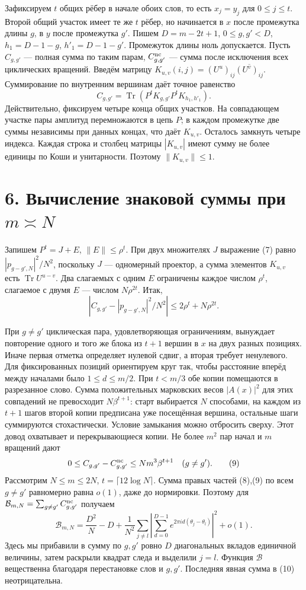 \documentclass[11pt,a4paper]{article}
\newcommand{\Tr}{\operatorname{Tr}}
\newcommand{\sect}[1]{\section*{\sffamily\color{ink}#1}}
\begin{document}
Зафиксируем $t$ общих рёбер в начале обоих слов, то есть $x_j=y_j$ для $0\le j\le t$. Второй общий участок имеет те же $t$ рёбер, но начинается в $x$ после промежутка длины $g$, в $y$ после промежутка $g'$. Пишем $D=m-2t+1$, $0\le g,g'<D$, $h_1=D-1-g$, $h'_1=D-1-g'$. Промежуток длины ноль допускается. Пусть $C_{g,g'}$ --- полная сумма по таким парам, $C^{\rm nc}_{g,g'}$ --- сумма после исключения всех циклических вращений. Введём матрицу $K_{u,v}(i,j)=(U^u)_{ij}\overline{(U^v)_{ij}}$. Суммирование по внутренним вершинам даёт точное равенство
\[
 C_{g,g'}=\Tr(P^t K_{g,g'} P^t K_{h_1,h'_1}).                          \tag{7}
\]
Действительно, фиксируем четыре конца общих участков. На совпадающем участке пары амплитуд перемножаются в цепь $P$; в каждом промежутке две суммы независимы при данных концах, что даёт $K_{u,v}$. Осталось замкнуть четыре индекса. Каждая строка и столбец матрицы $|K_{u,v}|$ имеют сумму не более единицы по Коши и унитарности. Поэтому $\|K_{u,v}\|\le1$.
\newpage
\sect{6. Вычисление знаковой суммы при $m\asymp N$}
Запишем $P^t=J+E$, $\|E\|\le\rho^t$. При двух множителях $J$ выражение (7) равно $|p_{g-g',N}|^2/N^2$, поскольку $J$ --- одномерный проектор, а сумма элементов $K_{u,v}$ есть $\Tr U^{u-v}$. Два слагаемых с одним $E$ ограничены каждое числом $\rho^t$, слагаемое с двумя $E$ --- числом $N\rho^{2t}$. Итак,
\[
 \left|C_{g,g'}-|p_{g-g',N}|^2/N^2\right|\le2\rho^t+N\rho^{2t}.         \tag{8}
\]

При $g\ne g'$ циклическая пара, удовлетворяющая ограничениям, вынуждает повторение одного и того же блока из $t+1$ вершин в $x$ на двух разных позициях. Иначе первая отметка определяет нулевой сдвиг, а вторая требует ненулевого. Для фиксированных позиций ориентируем круг так, чтобы расстояние вперёд между началами было $1\le d\le m/2$. При $t<m/3$ обе копии помещаются в разрезанное слово. Сумма положительных марковских весов $|A(x)|^2$ для этих совпадений не превосходит $N\beta^{t+1}$: старт выбирается $N$ способами, на каждом из $t+1$ шагов второй копии предписана уже посещённая вершина, остальные шаги суммируются стохастически. Условие замыкания можно отбросить сверху. Этот довод охватывает и перекрывающиеся копии. Не более $m^2$ пар начал и $m$ вращений дают
\[
 0\le C_{g,g'}-C^{\rm nc}_{g,g'}\le N m^3\beta^{t+1}\quad(g\ne g').      \tag{9}
\]
Рассмотрим $N\le m\le2N$, $t=\lceil12\log N\rceil$. Сумма правых частей (8),(9) по всем $g\ne g'$ равномерно равна $o(1)$, даже до нормировки. Поэтому для $\mathcal B_{m,N}=\sum_{g\ne g'} C^{\rm nc}_{g,g'}$ получаем
\[
 \mathcal B_{m,N}
 =\frac{D^2}{N}-D+
   \frac1{N^2}\sum_{j\ne l}\left|\sum_{d=0}^{D-1}
                  e^{2\pi i d(\theta_j-\theta_l)}\right|^2+o(1).          \tag{10}
\]
Здесь мы прибавили в сумму по $g,g'$ ровно $D$ диагональных вкладов единичной величины, затем раскрыли квадрат следа и выделили $j=l$. Функция $\mathcal B$ вещественна благодаря перестановке слов и $g,g'$. Последняя явная сумма в (10) неотрицательна.
\end{document}
